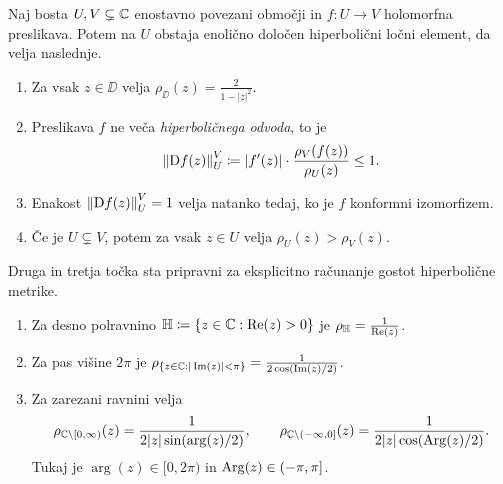 \begin{izrek}[Pick] \label{thm:pick}
    Naj bosta \(U, V \subsetneq \mathbb C\) enostavno povezani območji in \(f \colon U \to V\) holomorfna preslikava. Potem na \(U\) obstaja enolično določen hiperbolični ločni element, da velja naslednje.
    \begin{enumerate}
        \item Za vsak \(z \in \DD\) velja \(\rho_{\DD} (z) = \frac{2}{1 - |z|^2}\).
        \item Preslikava \(f\) ne veča \emph{hiperboličnega odvoda}, to je \[\left\| \mathrm{D} f (z) \right\|_{U}^{V} \coloneq |f' (z)| \cdot \frac{\rho_V (f (z))}{\rho_U (z)} \leq 1.\]
        \item Enakost \(\left\| \mathrm{D} f (z) \right\|_{U}^{V} = 1\) velja natanko tedaj, ko je \(f\) konformni izomorfizem.
        \item Če je \(U \subsetneq V\), potem za vsak \(z \in U\) velja \(\rho_U (z) > \rho_V (z)\). 
    \end{enumerate}
\end{izrek}

\noindent Druga in tretja točka sta pripravni za eksplicitno računanje gostot hiperbolične metrike.

\begin{trditev} \label{prop:hypexamples} \mbox{}
    \begin{enumerate}
        \item Za desno polravnino \(\mathbb H \coloneq \{ z \in \mathbb C : \operatorname{Re} (z) > 0 \}\) je \(\rho_\mathbb H = \frac{1}{\operatorname{Re} (z)}\).
        \item Za pas višine \(2 \pi\) je \(\rho_{\{z \in \mathbb C : |\operatorname{Im} (z)| < \pi\}} = \frac{1}{2 \cos (\operatorname{Im} (z) / 2)}\).
        \item Za zarezani ravnini velja
            \[
                \rho_{\mathbb C \setminus [0, \infty)} (z) = \frac{1}{2 |z| \sin (\arg (z) / 2)},
                \qquad
                \rho_{\mathbb C \setminus (-\infty, 0]} (z) = \frac{1}{2 |z| \cos (\operatorname{Arg} (z) / 2)}.
            \]
            Tukaj je \(\arg (z) \in [0, 2 \pi)\) in \(\operatorname{Arg} (z) \in (- \pi, \pi]\).
    \end{enumerate}
\end{trditev}
